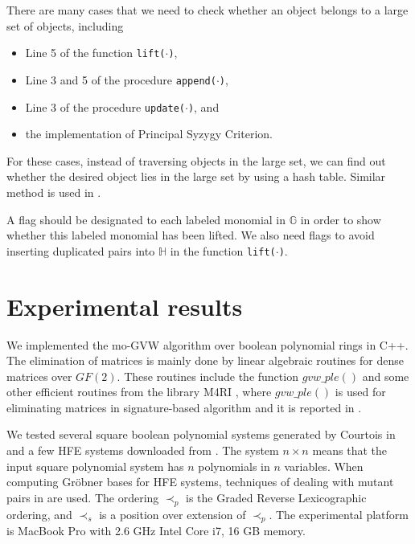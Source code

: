 \documentclass[final, number, 3p,12pt]{elsarticle}
\def\G{{\mathbb{G}}}
\def\H{{\mathbb{H}}}
\begin{document}
There are many cases that we need to check whether an object belongs to a large set of objects, including
\begin{itemize}

\item Line 5 of the function {\tt lift($\cdot$)}, 

\item Line 3 and 5 of the procedure {\tt append($\cdot$)}, 

\item Line 3 of the procedure {\tt update($\cdot$)}, and 

\item the implementation of Principal Syzygy Criterion.

\end{itemize}
For these cases, instead of traversing objects in the large set, we can find out whether the desired object lies in the large set  by using a hash table. Similar method is used in \citep{SunDW13}.


A flag should be designated to each labeled monomial in $\G$ in order to show whether this labeled monomial has been lifted. We also need flags to avoid inserting duplicated pairs into $\H$ in the function {\tt lift($\cdot$)}.







\section{Experimental results} \label{sec_timming}

We implemented the mo-GVW algorithm over boolean polynomial rings in C++. The elimination of matrices is mainly done by linear algebraic routines for dense matrices over $GF(2)$. These routines include the function $gvw\_ple()$ and some other efficient routines from the library M4RI \citep{Albrecht13}, where $gvw\_ple()$ is used for eliminating matrices in signature-based algorithm and it is reported in \cite{SunDW14}. 

We tested several square boolean polynomial systems generated by Courtois in \citep{Courtois13} and a few HFE systems downloaded from \citep{Steel04}. The system $n\times n$ means that the input square polynomial system has $n$ polynomials in $n$ variables. When computing Gr\"obner bases for HFE systems, techniques of dealing with mutant pairs in \citep{SunDW14} are used. The ordering $\prec_p$ is the Graded Reverse Lexicographic ordering, and $\prec_s$ is a position over extension of $\prec_p$. The experimental platform is MacBook Pro with 2.6 GHz Intel Core i7, 16 GB memory.
\end{document}
